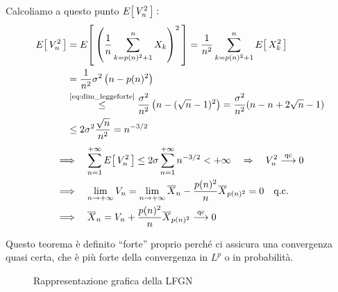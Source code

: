 \begin{dimostrazione}
        Calcoliamo a questo punto $E\!\left[\,V_n^2\,\right]:$
        \begin{align*}
            E\!\left[\,V_n^2\,\right] & = E\!\left[\,\left(\frac{1}{n} \sum_{k = p(n)^2 + 1}^n X_k\right)^2\,\right] = \frac{1}{n^2} \sum_{k = p(n)^2 + 1}^n E\!\left[\,X_k^2\,\right] \\
            & = \frac{1}{n^2} \sigma^2 \left(n-p(n)^2\right) \\
            & \overset{\text{\eqref{eq:dim_leggeforte}}}{\leq} \frac{\sigma^2}{n^2}\left(n - (\sqrt{n}-1)^2\right) = \frac{\sigma^2}{n^2}(n-n+2\sqrt{n} - 1)\\
            & \leq 2\sigma^2 \frac{\sqrt{n}}{n^2} = n^{-3/2}
        \end{align*}
        \begin{align*}
            & \Longrightarrow \quad \sum_{n=1}^{+\infty} E\!\left[\,V_n^2\,\right]\leq 2\sigma\sum_{n=1}^{+\infty}n^{-3/2} <+\infty \quad \Rightarrow\quad V_n^2\overset{\text{qc}}{\longrightarrow} 0\\
            & \Longrightarrow \quad \lim_{n\to+\infty} V_n = \lim_{n\to+\infty}\overline{X}_n - \frac{p(n)^2}{n}\overline{X}_{p(n)^2} = 0 \quad \text{q.c.}\\
            & \Longrightarrow \quad \overline{X}_n = V_n + \frac{p(n)^2}{n}\overline{X}_{p(n)^2} \overset{\text{qc}}{\longrightarrow} 0
        \end{align*}
    \end{dimostrazione}
Questo teorema è definito ``forte'' proprio perché ci assicura una convergenza quasi certa, che è più forte della convergenza in $L^p$ o in probabilità.

\begin{figure}[H]
    \centering
{}
    \caption{Rappresentazione grafica della LFGN}
\end{figure}

